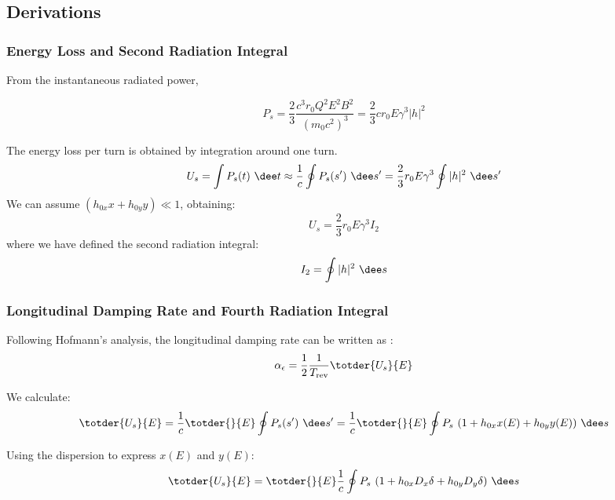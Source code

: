 \subsection{Derivations}
\subsubsection{Energy Loss and Second Radiation Integral}
\label{sec:enelossandi2}

From the instantaneous radiated power,

\begin{equation}
    P_s = \frac{2}{3}\frac{c^3 r_0 Q^2 E^2 B^2}{(m_0 c^2)^3} = \frac{2}{3} c r_0 E \gamma^3 |h|^2
    \label{eq:instpower}
\end{equation}

The energy loss per turn is obtained by integration around one turn.
\begin{equation}
U_s = \int P_s(t) \ \dee t \approx \frac{1}{c} \oint P_s(s') \ \dee s'
= \frac{2}{3} r_0 E \gamma^3 \oint |h|^2 \ \dee s'
\end{equation}
We can assume $(h_{0x}x + h_{0y}y) \ll 1$, obtaining:
\begin{equation}
\label{eq:enelossturn}
U_s =\frac{2}{3} r_0 E \gamma^3 I_{2}
\end{equation}
where we have defined the second radiation integral:
\begin{equation}
I_2     = \oint |h|^2 \ \dee s
\end{equation}

\subsubsection{Longitudinal Damping Rate and Fourth Radiation Integral}
\label{sec:longdampandi4}

Following Hofmann's analysis, the longitudinal damping rate can be written as \cite{hofmann_2004}:
\begin{equation}
    \alpha_\epsilon = \frac{1}{2} \frac{1}{T_\text{rev}} \totder{U_s}{E}
    \label{eq:alphadamp}
\end{equation}

We calculate:
\begin{equation}
    \totder{U_s}{E} = \frac{1}{c} \totder{}{E} \oint P_s(s') \ \dee s' = \frac{1}{c} \totder{}{E} \oint P_s \ (1 + h_{0x}x(E) + h_{0y}y(E))\ \dee s
    \label{eq:dUdEoint}
\end{equation}

Using the dispersion to express $x(E)$ and $y(E)$:
\begin{equation}
    \totder{U_s}{E} = \totder{}{E} \frac{1}{c} \oint P_s \ (1 + h_{0x}D_x \delta + h_{0y} D_y \delta)\ \dee s
\end{equation}

